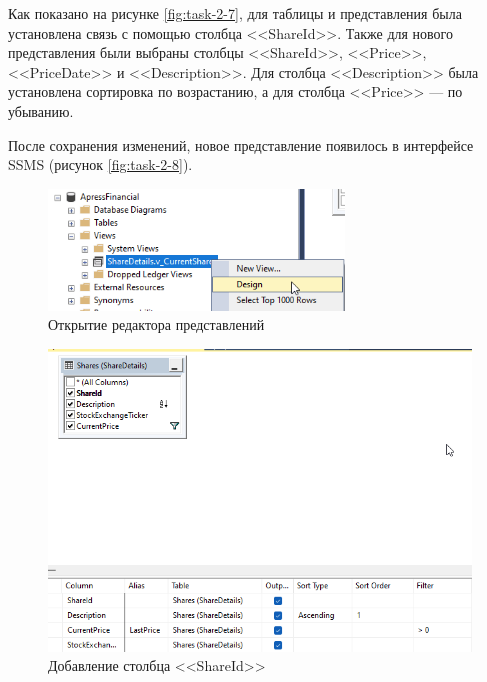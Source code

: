 \documentclass[a4paper, 14pt]{extarticle}
\begin{document}
Как показано на рисунке \ref{fig:task-2-7}, для таблицы и представления была
установлена связь с помощью столбца <<\foreignlanguage{english}{ShareId}>>.
Также для нового представления были выбраны столбцы
<<\foreignlanguage{english}{ShareId}>>, <<\foreignlanguage{english}{Price}>>,
<<\foreignlanguage{english}{PriceDate}>> и
<<\foreignlanguage{english}{Description}>>. Для столбца
<<\foreignlanguage{english}{Description}>> была установлена сортировка по
возрастанию, а для столбца <<\foreignlanguage{english}{Price}>> --- по
убыванию.

После сохранения изменений, новое представление появилось в интерфейсе SSMS
(рисунок \ref{fig:task-2-8}).

\begin{figure}[H]
  \centering
  \includegraphics[width=0.7\textwidth]{images/task-2/4.png}
  \caption{Открытие редактора представлений}
  \label{fig:task-2-4}
\end{figure}

\begin{figure}[H]
  \centering
  \includegraphics[width=\textwidth]{images/task-2/5.png}
  \caption{Добавление столбца <<\foreignlanguage{english}{ShareId}>>}
  \label{fig:task-2-5}
\end{figure}
\end{document}
